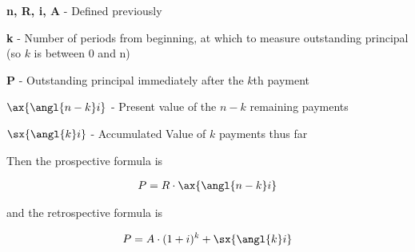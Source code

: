\documentclass[12pt]{article}
\begin{document}
\begin{description}
    \item\textbf{n, R, i, A} - Defined previously
    \item\textbf{k    } - Number of periods from beginning, at which to measure outstanding principal (so $ k $ is between 0 and n)
    \item\textbf{P    } - Outstanding principal immediately after the $ k $th payment
    \item\textbf{{$ \ax{ \angl{n-k} i} $}} - Present value of the $ n-k $ remaining payments
    \item\textbf{{$ \sx{ \angl{k} i} $}} - Accumulated Value of $ k $ payments thus far
\end{description}
\vspace{.1in}

\begin{flushleft}
    Then the prospective formula is
\end{flushleft}
\vspace{-.2in}

\begin{align*}
    P & = R \cdot \ax{ \angl{n-k} i} \\
\end{align*}
\vspace{-.3in}

\begin{flushleft}
    and the retrospective formula is
\end{flushleft}

\begin{align*}
    P & = A \cdot (1+i)^k + \sx{ \angl{k} i} \\
\end{align*}
\vspace{-.2in}
\end{document}
